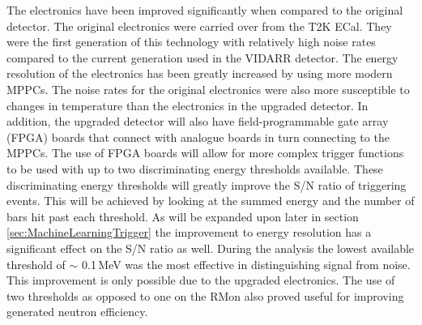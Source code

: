 The electronics have been improved significantly when compared to the original detector. The original electronics were carried over from the T2K ECal. They were the first generation of this technology with relatively high noise rates compared to the current generation used in the VIDARR detector. The energy resolution of the electronics has been greatly increased by using more modern MPPCs. The noise rates for the original electronics were also more susceptible to changes in temperature than the electronics in the upgraded detector. In addition, the upgraded detector will also have field-programmable gate array (FPGA) boards that connect with analogue boards in turn connecting to the MPPCs. The use of FPGA boards will allow for more complex trigger functions to be used with up to two discriminating energy thresholds available. These discriminating energy thresholds will greatly improve the S/N ratio of triggering events. This will be achieved by looking at the summed energy and the number of bars hit past each threshold. As will be expanded upon later in section \ref{sec:MachineLearningTrigger} the improvement to energy resolution has a significant effect on the S/N ratio as well. During the analysis the lowest available threshold of $\sim$ 0.1\,MeV was the most effective in distinguishing signal from noise. This improvement is only possible due to the upgraded electronics. The use of two thresholds as opposed to one on the RMon also proved useful for improving generated neutron efficiency. 
